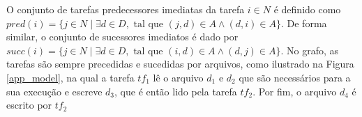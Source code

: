 O conjunto de tarefas predecessores imediatas da tarefa $i \in N$ é definido como $pred (i) = \{j \in N  \mid   \exists d \in D, \mbox{ tal que }  (j, d) \in A  \wedge (d, i) \in A\}$. De forma similar, o conjunto de sucessores imediatos é dado por $succ (i) = \{j \in N  \mid  \exists  d \in D, \mbox{ tal que } (i, d) \in A   \wedge  (d, j) \in A\}$. No grafo, as tarefas são sempre precedidas e sucedidas por arquivos, como ilustrado na Figura \ref{app_model}, na qual a tarefa $tf_1$ lê o arquivo $d_1$ e $d_2$ que são necessários para a sua execução e escreve $d_3$,  que é então lido pela tarefa $tf_2$. Por fim, o arquivo $d_4$ é escrito por $tf_2$ 

	
